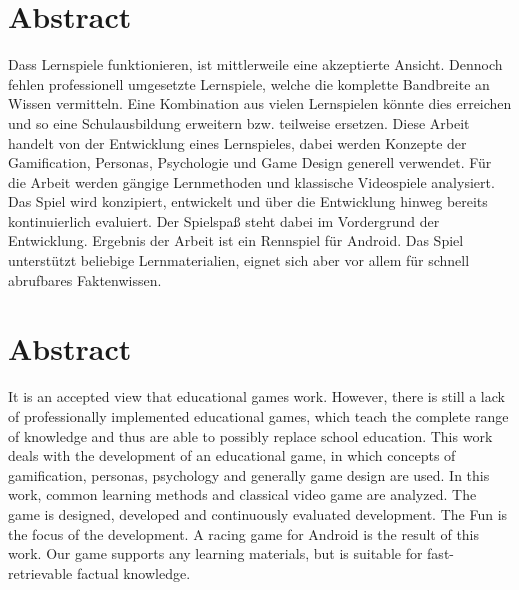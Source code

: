 \section*{Abstract}
Dass Lernspiele funktionieren, ist mittlerweile eine akzeptierte Ansicht. Dennoch fehlen professionell umgesetzte Lernspiele, welche die komplette Bandbreite an Wissen vermitteln. Eine Kombination aus vielen Lernspielen könnte dies erreichen und so eine Schulausbildung erweitern bzw. teilweise ersetzen.
Diese Arbeit handelt von der Entwicklung eines Lernspieles, dabei werden Konzepte der Gamification, Personas, Psychologie und Game Design generell verwendet. Für die Arbeit werden gängige Lernmethoden und klassische Videospiele analysiert. Das Spiel wird konzipiert, entwickelt und über die Entwicklung hinweg bereits kontinuierlich evaluiert. Der Spielspaß steht dabei im Vordergrund der Entwicklung.
Ergebnis der Arbeit ist ein Rennspiel für Android. Das Spiel unterstützt beliebige Lernmaterialien, eignet sich aber vor allem für schnell abrufbares Faktenwissen.

\vfill

\section*{Abstract}
It is an accepted view that educational games work. However, there is still a lack of professionally implemented educational games, which teach the complete range of knowledge and thus are able to possibly replace school education.
This work deals with the development of an educational game, in which concepts of gamification, personas, psychology and generally game design are used. In this work, common learning methods and classical video game are analyzed. The game is designed, developed and continuously evaluated development. The Fun is the focus of the development.
A racing game for Android is the result of this work. Our game supports any learning materials, but is suitable for fast-retrievable factual knowledge.

\vfill\vfill\newpage
